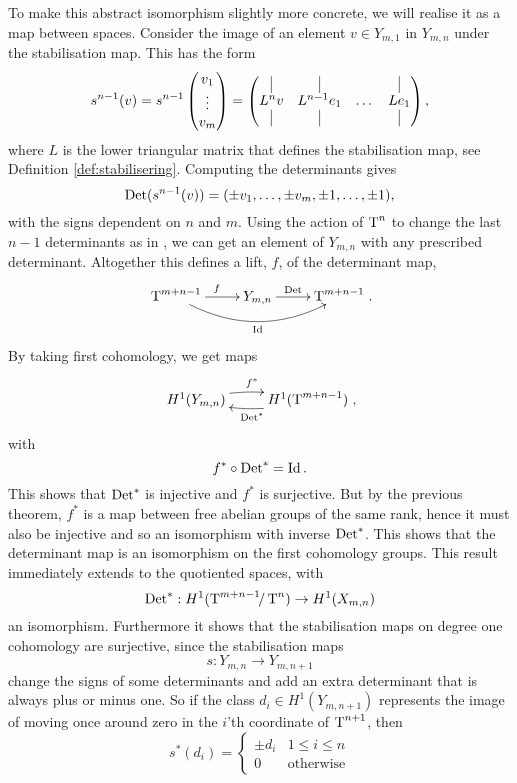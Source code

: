To make this abstract isomorphism slightly more concrete, we will
realise it as a map between spaces. Consider the image of an element
$v \in Y_{m,1}$ in $Y_{m,n}$ under the stabilisation map. This has the
form 
\[ s^{n-1}(v) = s^{n-1}
\begin{pmatrix}
  v_1 \\
  \vdots \\
  v_m
\end{pmatrix} =
\begin{pmatrix}
  \vrule & \vrule & & \vrule \\
  L^{n} v & L^{n-1}e_1 & \dots & Le_1 \\
  \vrule & \vrule & & \vrule
\end{pmatrix},
\]
where $L$ is the lower triangular matrix that defines the
stabilisation map, see Definition \ref{def:stabilisering}. Computing the
determinants gives
\[ \operatorname{Det}(s^{n-1}(v)) = (\pm v_1,\dots,\pm v_m, \pm 1, \dots,\pm 1), \]
with the signs dependent on $n$ and $m$. Using the action of
$\operatorname{T}^{n}$ to change the last $n-1$ determinants as in
, we can get an element of $Y_{m,n}$ with any prescribed
determinant. Altogether this defines a lift, $f$, of the
determinant map,
\[ \xymatrix{ \T^{m+n-1} \ar[r]^f \ar@/_1.5pc/[rr]_\Id & Y_{m,n}
  \ar[r]^<<<<<\Det & \T^{m+n-1}}. \]
By taking first cohomology, we get maps
\[ \xymatrix{ H^1(Y_{m,n}) \ar@/^/[r]^{f^*} & H^1(\T^{m+n-1})
  \ar@/^/[l]^{\Det^*} }, \]
with 
\[ f^* \circ \operatorname{Det}^* = \operatorname{Id}. \]
This shows that $\operatorname{Det}^*$ is injective and $f^*$ is surjective. But by
the previous theorem, $f^*$ is a map between free abelian groups of
the same rank, hence it must also be injective and so an
isomorphism with inverse $\operatorname{Det}^*$. This shows that the determinant map
is an isomorphism on the first cohomology groups.
This result immediately extends to the quotiented spaces, with
\[ \operatorname{Det}^* : H^1(\operatorname{T}^{m+n-1}\!\!/\operatorname{T}^{n}) \to H^1(X_{m,n}) \]
an isomorphism. Furthermore it shows that the stabilisation maps on
degree one cohomology are surjective, since the stabilisation maps
\[ s: Y_{m,n} \to Y_{m,n+1} \]
change the signs of some determinants and add an extra determinant
that is always plus or minus one. So if the class $d_i \in
H^1(Y_{m,n+1})$ represents the image of moving once around zero in the
$i$'th coordinate of $\operatorname{T}^{n+1}$, then
\[ s^*(d_i) =
\begin{cases}
  \pm d_i & 1 \leq i \leq n \\
  0 & \text{otherwise}
\end{cases} \] 


